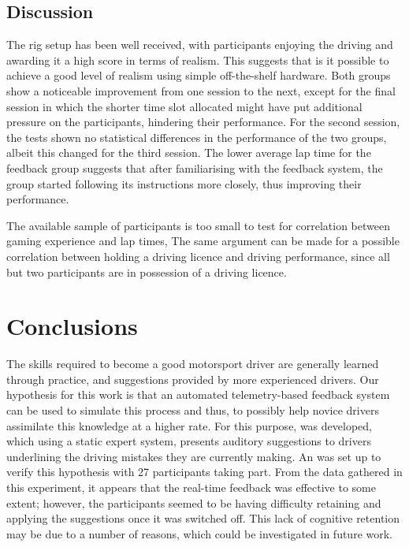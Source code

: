 \documentclass{sig-alternate}
\begin{document}
{{\subsection{Discussion}
The rig setup has been well received, with participants enjoying the driving and awarding it a high score in terms of realism. This suggests that is it possible to achieve a good level of realism using simple off-the-shelf hardware. 
Both groups show a noticeable improvement from one session to the next, except for the final session in which the shorter time slot allocated might have put additional pressure on the participants, hindering their performance.
For the second session, the tests shown no statistical differences in the performance of the two groups, albeit this changed for the third session. The lower average lap time for the feedback group suggests that after familiarising with the feedback system, the group started following its instructions more closely, thus improving their performance.

The available sample of participants is too small to test for correlation between gaming experience and lap times, The same argument can be made for a possible correlation between holding a driving licence and driving performance, since all but two participants are in possession of a driving licence.
}

\section{Conclusions} {
\label{sec:Conclusions}
The skills required to become a good motorsport driver are generally learned through practice, and suggestions provided by more experienced drivers. Our hypothesis for this work is that an automated telemetry-based feedback system can be used to simulate this process and thus, to possibly help novice drivers assimilate this knowledge at a higher rate. For this purpose, \methodname was developed, which using a static expert system, presents auditory suggestions to drivers underlining the driving mistakes they are currently making. An was set up to verify this hypothesis with 27 participants taking part. From the data gathered in this experiment, it appears that the real-time feedback was effective to some extent; however, the participants seemed to be having difficulty retaining and applying the suggestions once it was switched off. This lack of cognitive retention may be due to a number of reasons, which could be investigated in future work.

}}
\end{document}
